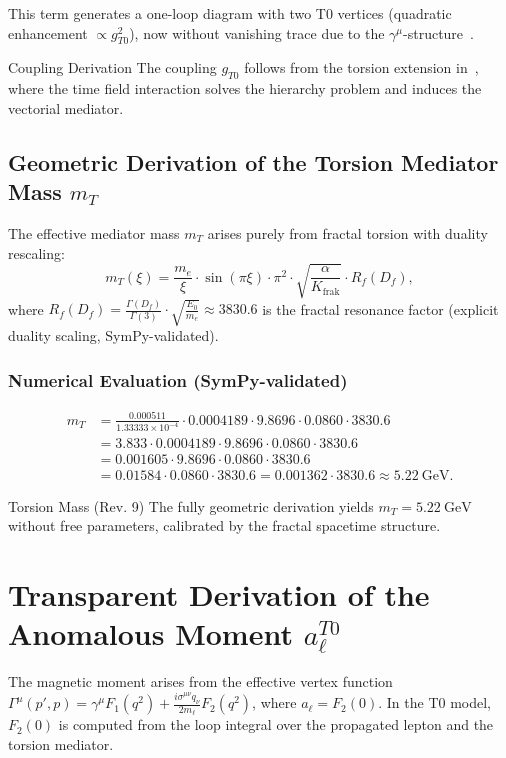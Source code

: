 \documentclass[12pt,a4paper]{article}
\theoremstyle{definition}
\begin{document}
	This term generates a one-loop diagram with two T0 vertices (quadratic enhancement $\propto g_{T0}^2$), now without vanishing trace due to the $\gamma^\mu$-structure~\cite{bell_muon}.
	
	\begin{derivation}{Coupling Derivation}
		The coupling $g_{T0}$ follows from the torsion extension in~\cite{QFT_T0}, where the time field interaction solves the hierarchy problem and induces the vectorial mediator.
	\end{derivation}
	
	\subsection{Geometric Derivation of the Torsion Mediator Mass $m_T$}
	The effective mediator mass $m_T$ arises purely from fractal torsion with duality rescaling:
	\begin{equation}
		m_T(\xi) = \frac{m_e}{\xi} \cdot \sin(\pi \xi) \cdot \pi^2 \cdot \sqrt{\frac{\alpha}{K_{\text{frak}}}} \cdot R_f(D_f),
	\end{equation}
	where $R_f(D_f) = \frac{\Gamma(D_f)}{\Gamma(3)} \cdot \sqrt{\frac{E_0}{m_e}} \approx 3830.6$ is the fractal resonance factor (explicit duality scaling, SymPy-validated).
	
	\subsubsection{Numerical Evaluation (SymPy-validated)}
	\begin{align*}
		m_T &= \frac{0.000511}{1.33333\times 10^{-4}} \cdot 0.0004189 \cdot 9.8696 \cdot 0.0860 \cdot 3830.6 \\
		&= 3.833 \cdot 0.0004189 \cdot 9.8696 \cdot 0.0860 \cdot 3830.6 \\
		&= 0.001605 \cdot 9.8696 \cdot 0.0860 \cdot 3830.6 \\
		&= 0.01584 \cdot 0.0860 \cdot 3830.6 = 0.001362 \cdot 3830.6 \approx 5.22\ \text{GeV}.
	\end{align*}
	
	\begin{result}{Torsion Mass (Rev. 9)}
		The fully geometric derivation yields $m_T = \SI{5.22}{\giga\electronvolt}$ without free parameters, calibrated by the fractal spacetime structure.
	\end{result}
	
	\section{Transparent Derivation of the Anomalous Moment $a_\ell^{T0}$}
	The magnetic moment arises from the effective vertex function $\Gamma^\mu(p',p) = \gamma^\mu F_1(q^2) + \frac{i \sigma^{\mu\nu} q_\nu}{2 m_\ell} F_2(q^2)$, where $a_\ell = F_2(0)$. In the T0 model, $F_2(0)$ is computed from the loop integral over the propagated lepton and the torsion mediator.
	
\end{document}

